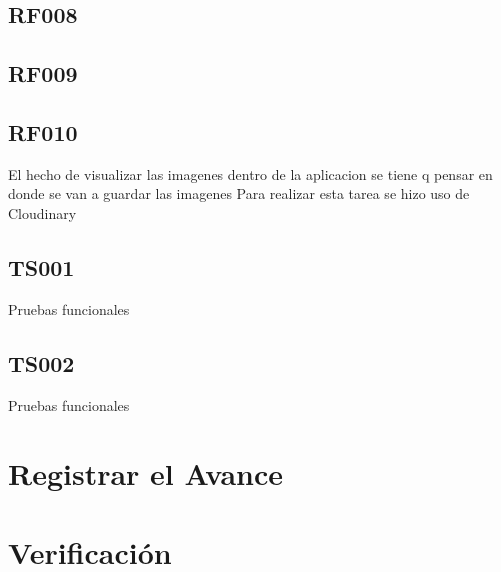 \subsection{RF008}
\label{sub:RF008}

\subsection{RF009}
\label{sub:RF009}

\subsection{RF010}
\label{sub:RF010}
 El hecho de visualizar las imagenes dentro de la aplicacion se tiene q pensar en donde se van a guardar las imagenes
 Para realizar esta tarea se hizo uso de Cloudinary

\subsection{TS001}
\label{sub:TS001}

Pruebas funcionales


\subsection{TS002}
\label{sub:TS002}

Pruebas funcionales

\section{Registrar el Avance}
\label{sec:iteracion1_avance}

\section{Verificación}
\label{sec:iteracion1_verificacion}
